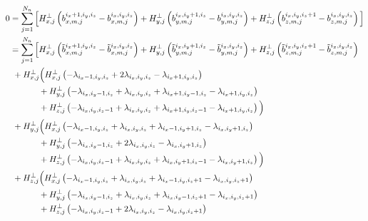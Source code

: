 \documentclass[12pt,a4paper]{article}
\begin{document}
\begin{align*}
0 &= \sum_{j=1}^{N_n} \Big[ H^\bot_{x,j} \left( b_{x,m,j}^{i_x+1,i_y,i_z} - b_{x,m,j}^{i_x,i_y,i_z} \right) + H^\bot_{y,j} \left( b_{y,m,j}^{i_x,i_y+1,i_z} - b_{y,m,j}^{i_x,i_y,i_z} \right) + H^\bot_{z,j} \left( b_{z,m,j}^{i_x,i_y,i_z+1} - b_{z,m,j}^{i_x,i_y,i_z} \right) \Big] \\
&=  \sum_{j=1}^{N_n} \Big[ H^\bot_{x,j} \left( \tilde{b}_{x,m,j}^{i_x+1,i_y,i_z} - \tilde{b}_{x,m,j}^{i_x,i_y,i_z} \right) + H^\bot_{y,j} \left( \tilde{b}_{y,m,j}^{i_x,i_y+1,i_z} - \tilde{b}_{y,m,j}^{i_x,i_y,i_z} \right) + H^\bot_{z,j} \left( \tilde{b}_{z,m,j}^{i_x,i_y,i_z+1} - \tilde{b}_{z,m,j}^{i_x,i_y,i_z} \right) \\
& \ + H^\bot_{x,j} \Big( 
    H_{x , j}^\bot \left( -  \lambda_{i_x-1,i_y,i_z} + 2 \lambda_{i_x,i_y,i_z} -  \lambda_{i_x+1,i_y,i_z} \right) \\
&\hspace{1.2 cm} + H_{y , j}^\bot \left(  - \lambda_{i_x,i_y-1,i_z}  +  \lambda_{i_x,i_y,i_z} + \lambda_{i_x+1,i_y-1,i_z}  -  \lambda_{i_x+1,i_y,i_z} \right) \\
&\hspace{1.2 cm} + H_{z , j}^\bot \left(  - \lambda_{i_x,i_y,i_z-1} +  \lambda_{i_x,i_y,i_z} + \lambda_{i_x+1,i_y,i_z-1} -  \lambda_{i_x+1,i_y,i_z} \right)  
\Big) \\
& \ + H^\bot_{y,j} \Big(
   H_{x , j}^\bot \left( -  \lambda_{i_x-1,i_y,i_z} +  \lambda_{i_x,i_y,i_z} + \lambda_{i_x-1,i_y+1,i_z} -  \lambda_{i_x,i_y+1,i_z} \right)  \\
&\hspace{1.2 cm}  + H_{y , j}^\bot  \left( - \lambda_{i_x,i_y-1,i_z}  +  2 \lambda_{i_x,i_y,i_z}  -  \lambda_{i_x,i_y+1,i_z} \right)  \\
&\hspace{1.2 cm} + H_{z , j}^\bot \left( - \lambda_{i_x,i_y,i_z-1} +  \lambda_{i_x,i_y,i_z} + \lambda_{i_x,i_y+1,i_z-1} -  \lambda_{i_x,i_y+1,i_z} \right) \Big)  \\
& \ + H^\bot_{z,j} \Big(
    H_{x , j}^\bot  \left(-  \lambda_{i_x-1,i_y,i_z} +  \lambda_{i_x,i_y,i_z} +  \lambda_{i_x-1,i_y,i_z+1} -  \lambda_{i_x,i_y,i_z+1} \right) \\
&\hspace{1.2 cm} + H_{y , j}^\bot  \left( - \lambda_{i_x,i_y-1,i_z}  +  \lambda_{i_x,i_y,i_z} + \lambda_{i_x,i_y-1,i_z+1}  -  \lambda_{i_x,i_y,i_z+1} \right)  \\
&\hspace{1.2 cm} + H_{z , j}^\bot  \left( - \lambda_{i_x,i_y,i_z-1} +  2 \lambda_{i_x,i_y,i_z} -  \lambda_{i_x,i_y,i_z+1} \right) 

\end{align*}
\end{document}
